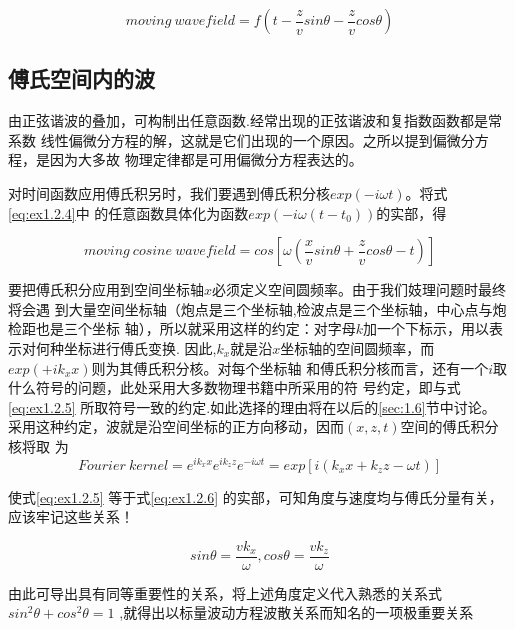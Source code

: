   \begin{equation}
  moving\ wavefield = f(t-\frac{z}{v}sin\theta-\frac{z}{v}cos\theta)
  \label{eq:ex1.2.4}
  \end{equation}

 \subsection{傅氏空间内的波}
 \label{sec:1.2.2}

 由正弦谐波的叠加，可构制出任意函数.经常出现的正弦谐波和复指数函数都是常系数
 线性偏微分方程的解，这就是它们出现的一个原因。之所以提到偏微分方程，是因为大多故
 物理定律都是可用偏微分方程表达的。


 对时间函数应用傅氏积另时，我们要遇到傅氏积分核$exp(-i\omega t)$。将式\ref{eq:ex1.2.4}中
 的任意函数具体化为函数$exp(-i\omega (t-t_{0}))$的实部，得

  \begin{equation}
  moving\ cosine\ wavefield = cos[\omega(\frac{x}{v}sin\theta+\frac{z}{v}cos\theta-t)]
  \label{eq:ex1.2.5}
  \end{equation}

  要把傅氏积分应用到空间坐标轴$x$必须定义空间圆频率。由于我们妓理问题时最终将会遇
  到大量空间坐标轴（炮点是三个坐标轴,检波点是三个坐标轴，中心点与炮检距也是三个坐标
  轴），所以就采用这样的约定：对字母$k$加一个下标示，用以表示对何种坐标进行傅氏变换.
  因此,$k_{x}$就是沿$x$坐标轴的空间圆频率，而$exp(+ik_{x}x)$则为其傅氏积分核。对每个坐标轴
  和傅氏积分核而言，还有一个$i$取什么符号的问题，此处采用大多数物理书籍中所采用的符
  号约定，即与式\ref{eq:ex1.2.5}
  所取符号一致的约定.如此选择的理由将在以后的\ref{sec:1.6}节中讨论。
  采用这种约定，波就是沿空间坐标的正方向移动，因而$(x,z,t)$空间的傅氏积分核将取
  为
  \begin{equation}
  Fourier\ kernel =
                e^{ik_{x}x}e^{ik_{z}z}e^{-i\omega t} = exp[i(k_{x}x+k_{z}z-\omega t)]
  \label{eq:ex1.2.6}
  \end{equation}

  使式\ref{eq:ex1.2.5}
  等于式\ref{eq:ex1.2.6}
  的实部，可知角度与速度均与傅氏分量有关，应该牢记这些关系！

  \begin{equation}
  sin\theta=\frac{vk_{x}}{\omega},cos\theta=\frac{vk_{z}}{\omega}
  \label{eq:ex1.2.7}
  \end{equation}

  由此可导出具有同等重要性的关系，将上述角度定义代入熟悉的关系式$sin^{2}\theta+cos^{2}\theta=1$
  ,就得出以标量波动方程波散关系而知名的一项极重要关系

